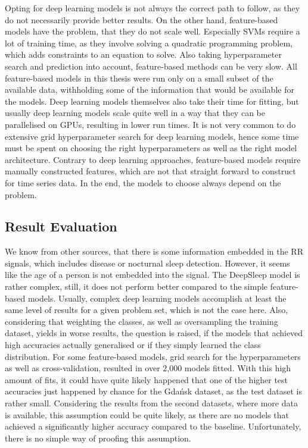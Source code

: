 \documentclass[11pt]{scrartcl}
\begin{document}
Opting for deep learning models is not always the correct path to follow, as they do not necessarily provide better results. On the other hand, feature-based models have the problem, that they do not scale well. Especially SVMs require a lot of training time, as they involve solving a quadratic programming problem, which adds constraints to an equation to solve. Also taking hyperparameter search and prediction into account, feature-based methods can be very slow. All feature-based models in this thesis were run only on a small subset of the available data, withholding some of the information that would be available for the models. Deep learning models themselves also take their time for fitting, but usually deep learning models scale quite well in a way that they can be parallelised on GPUs, resulting in lower run times. It is not very common to do extensive grid hyperparameter search for deep learning models, hence some time must be spent on choosing the right hyperparameters as well as the right model architecture. Contrary to deep learning approaches, feature-based models require manually constructed features, which are not that straight forward to construct for time series data. In the end, the models to choose always depend on the problem.

\subsection{Result Evaluation}

We know from other sources, that there is some information embedded in the RR signals, which includes disease or nocturnal sleep detection. However, it seems like the age of a person is not embedded into the signal. The DeepSleep model is rather complex, still, it does not perform better compared to the simple feature-based models. Usually, complex deep learning models accomplish at least the same level of results for a given problem set, which is not the case here. Also, considering that weighting the classes, as well as oversampling the training dataset, yields in worse results, the question is raised, if the models that achieved high accuracies actually generalised or if they simply learned the class distribution. For some feature-based models, grid search for the hyperparameters as well as cross-validation, resulted in over 2,000 models fitted. With this high amount of fits, it could have quite likely happened that one of the higher test accuracies just happened by chance for the Gdańsk dataset, as the test dataset is rather small. Considering the results from the second datasets, where more data is available, this assumption could be quite likely, as there are no models that achieved a significantly higher accuracy compared to the baseline. Unfortunately, there is no simple way of proofing this assumption.
\end{document}

